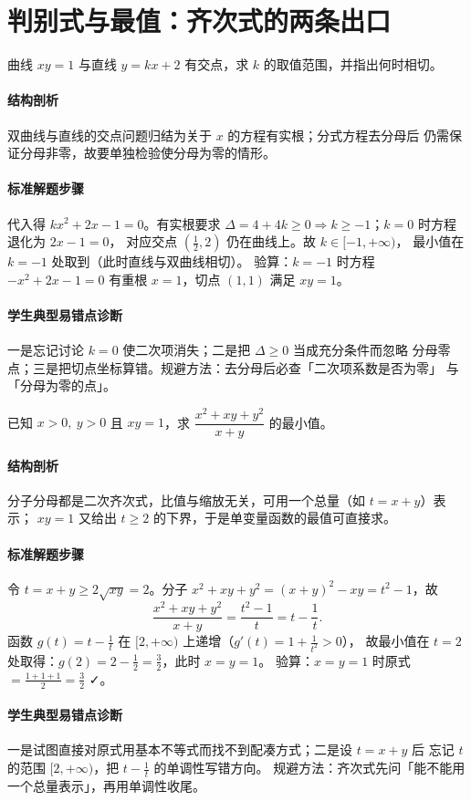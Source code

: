 \section{判别式与最值：齐次式的两条出口}

\begin{problem}
曲线 $xy=1$ 与直线 $y=kx+2$ 有交点，求 $k$ 的取值范围，并指出何时相切。
\end{problem}
\begin{solution}
\paragraph{结构剖析}
双曲线与直线的交点问题归结为关于 $x$ 的方程有实根；分式方程去分母后
仍需保证分母非零，故要单独检验使分母为零的情形。
\paragraph{标准解题步骤}
代入得 $kx^2+2x-1=0$。有实根要求
$\Delta=4+4k\ge0\Rightarrow k\ge-1$；$k=0$ 时方程退化为 $2x-1=0$，
对应交点 $\left(\frac12,2\right)$ 仍在曲线上。故 $k\in[-1,+\infty)$，
最小值在 $k=-1$ 处取到（此时直线与双曲线相切）。
验算：$k=-1$ 时方程 $-x^2+2x-1=0$ 有重根 $x=1$，切点 $(1,1)$ 满足 $xy=1$。
\paragraph{学生典型易错点诊断}
一是忘记讨论 $k=0$ 使二次项消失；二是把 $\Delta\ge0$ 当成充分条件而忽略
分母零点；三是把切点坐标算错。规避方法：去分母后必查「二次项系数是否为零」
与「分母为零的点」。
\end{solution}

\begin{problem}
已知 $x>0,\ y>0$ 且 $xy=1$，求 $\dfrac{x^2+xy+y^2}{x+y}$ 的最小值。
\end{problem}
\begin{solution}
\paragraph{结构剖析}
分子分母都是二次齐次式，比值与缩放无关，可用一个总量（如 $t=x+y$）表示；
$xy=1$ 又给出 $t\ge2$ 的下界，于是单变量函数的最值可直接求。
\paragraph{标准解题步骤}
令 $t=x+y\ge2\sqrt{xy}=2$。分子 $x^2+xy+y^2=(x+y)^2-xy=t^2-1$，故
\[
  \frac{x^2+xy+y^2}{x+y}=\frac{t^2-1}{t}=t-\frac1t .
\]
函数 $g(t)=t-\frac1t$ 在 $[2,+\infty)$ 上递增（$g'(t)=1+\frac1{t^2}>0$），
故最小值在 $t=2$ 处取得：$g(2)=2-\frac12=\frac32$，此时 $x=y=1$。
验算：$x=y=1$ 时原式 $=\frac{1+1+1}{2}=\frac32$ ✓。
\paragraph{学生典型易错点诊断}
一是试图直接对原式用基本不等式而找不到配凑方式；二是设 $t=x+y$ 后
忘记 $t$ 的范围 $[2,+\infty)$，把 $t-\frac1t$ 的单调性写错方向。
规避方法：齐次式先问「能不能用一个总量表示」，再用单调性收尾。
\end{solution}

